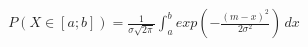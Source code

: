 \documentclass[preview]{standalone}
\begin{document}
\begin{align*}
P( X \in [a;b] ) = { \frac{1}{\sigma \sqrt{2\pi}} } \int_a^b { exp(-{ \frac{(m - x)^2}{2 \sigma^2} }) } \, dx
\end{align*}
\end{document}
